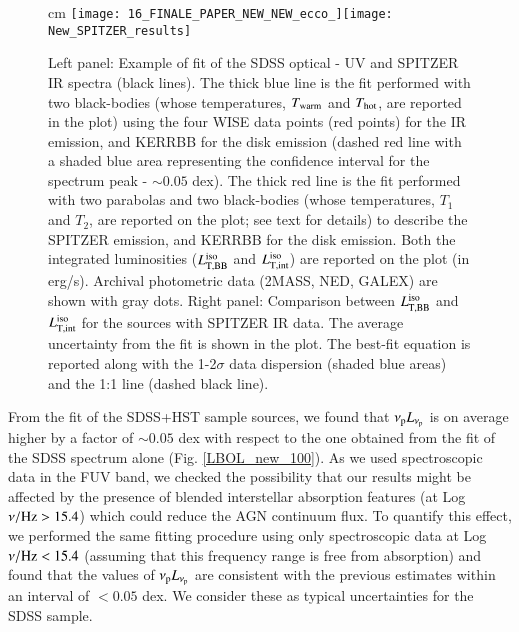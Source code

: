 \documentclass[]{aa}
\begin{document}
\begin{figure*}
\centering
{} cm
\texttt{[image: 16\_FINALE\_PAPER\_NEW\_NEW\_ecco\_]}\texttt{[image: New\_SPITZER\_results]}
\caption{Left panel: Example of fit of the SDSS optical - UV and SPITZER IR spectra (black lines). The thick blue line is the fit performed with two black-bodies (whose temperatures, $T_{\rm warm}$ and $T_{\rm hot}$, are reported in the plot) using the four WISE data points (red points) for the IR emission, and KERRBB for the disk emission (dashed red line with a shaded blue area representing the confidence interval for the spectrum peak - $\sim 0.05$ dex). The thick red line is the fit performed with two parabolas and two black-bodies (whose temperatures, $T_{1}$ and $T_2$, are reported on the plot; see text for details) to describe the SPITZER emission, and KERRBB for the disk emission. Both the integrated luminosities ($L^{\rm iso}_{\rm T, BB}$ and $L^{\rm iso}_{\rm T, int}$) are reported on the plot (in erg/s). Archival photometric data (2MASS, NED, GALEX) are shown with gray dots. Right panel: Comparison between $L^{\rm iso}_{\rm T,BB}$ and $L^{\rm iso}_{\rm T,int}$ for the sources with SPITZER IR data. The average uncertainty from the fit is shown in the plot. The best-fit equation is reported along with the 1-2$\sigma$ data dispersion (shaded blue areas) and the 1:1 line (dashed black line).}
\label{plot_example_SPITZ}
\end{figure*}

From the fit of the SDSS+HST sample sources, we found that $\nu_{\rm p}L_{\nu_{\rm p}}$ is on average higher by a factor of $\sim 0.05$ dex with respect to the one obtained from the fit of the SDSS spectrum alone (Fig. \ref{LBOL_new_100}). As we used spectroscopic data in the FUV band, we checked the possibility that our results might be affected by the presence of blended interstellar absorption features (at Log $\nu / {\rm Hz} > 15.4$) which could reduce the AGN continuum flux. To quantify this effect, we performed the same fitting procedure using only spectroscopic data at Log $\nu / {\rm Hz} < 15.4$ (assuming that this frequency range is free from absorption) and found that the values of $\nu_{\rm p} L_{\nu_{\rm p}}$ are consistent with the previous estimates within an interval of $< 0.05$ dex. We consider these as typical uncertainties for the SDSS sample.






\end{document}
